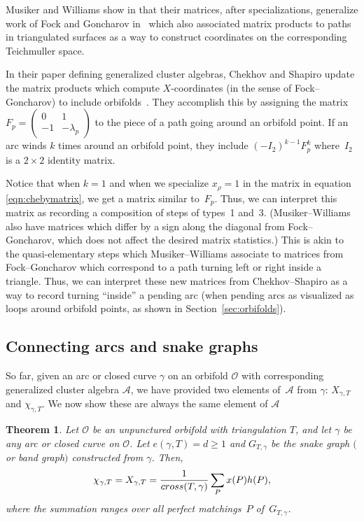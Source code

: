 \documentclass[11pt]{article}
\numberwithin{equation}{section}
\newtheorem{Theorem}{Theorem}[section]
\begin{document}
\begin{Remark}Musiker and Williams show in \cite[Section~4]{MW} that their matrices, after specializations, generalize work of Fock and Goncharov in~\cite{FG3} which also associated matrix products to paths in triangulated surfaces as a way to construct coordinates on the corresponding Teichmuller space.

In their paper defining generalized cluster algebras, Chekhov and Shapiro update the matrix products which compute $X$-coordinates (in the sense of Fock--Goncharov) to include orbifolds~\cite{Chekhov-Shapiro}.
They accomplish this by assigning the matrix $F_p = \left(\begin{smallmatrix} 0 & 1 \\ -1 & -\lambda_p \end{smallmatrix}\right)$ to the piece of a path going around an orbifold point. If an arc winds $k$ times around an orbifold point, they include $(-I_2)^{k-1}F_p^k$ where~$I_2$ is a $2 \times 2$ identity matrix.

Notice that when $k = 1$ and when we specialize $x_\rho = 1$ in the matrix in equation \eqref{eqn:chebymatrix}, we get a matrix similar to~$F_p$. Thus, we can interpret this matrix as recording a composition of steps of types~1 and~3. (Musiker--Williams also have matrices which differ by a sign along the diagonal from Fock--Goncharov, which does not affect the desired matrix statistics.) This is akin to the quasi-elementary steps which Musiker--Williams associate to matrices from Fock--Goncharov which correspond to a path turning left or right inside a triangle. Thus, we can interpret these new matrices from Chekhov--Shapiro as a way to record turning ``inside'' a pending arc (when pending arcs as visualized as loops around orbifold points, as shown in Section~\ref{sec:orbifolds}).
\end{Remark}

\subsection{Connecting arcs and snake graphs}

So far, given an arc or closed curve $\gamma$ on an orbifold $\mathcal{O}$ with corresponding generalized cluster algebra $\mathcal{A}$, we have provided two elements of~$\mathcal{A}$ from $\gamma$: $X_{\gamma,T}$ and $\chi_{\gamma,T}$. We now show these are always the same element of $\mathcal{A}$

\begin{Theorem}\label{Thm:ArcsAndGraphs}
Let $\mathcal{O}$ be an unpunctured orbifold with triangulation $T$, and let $\gamma$ be any arc or closed curve on $\mathcal{O}$. Let $e(\gamma, T) = d \geq 1$ and $G_{T,\gamma}$ be the snake graph $($or band graph$)$ constructed from $\gamma$. Then,
\begin{equation}\label{MandGraphEqn}
\chi_{\gamma,T} = X_{\gamma,T} = \frac{1}{{\rm cross}(T,\gamma)} \sum_P x(P) h(P),
\end{equation}
where the summation ranges over all perfect matchings~$P$ of~$G_{T,\gamma}$.
\end{Theorem}
\end{document}
